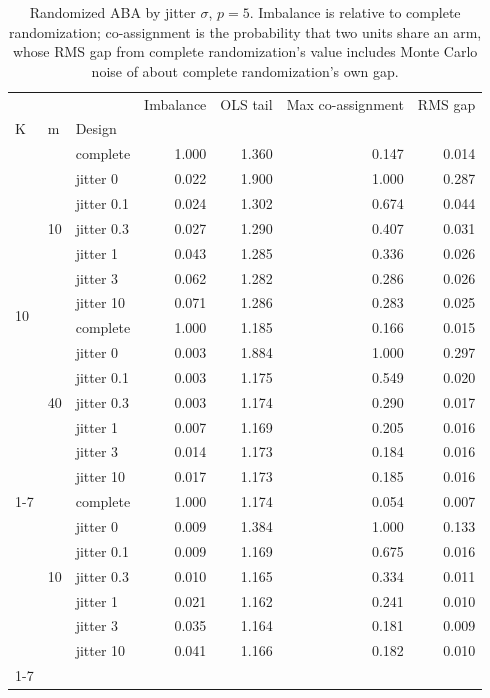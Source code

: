 \begin{table}[t]
\centering
\caption{Randomized ABA by jitter $\sigma$, $p = 5$. Imbalance is relative to complete randomization; co-assignment is the probability that two units share an arm, whose RMS gap from complete randomization's value includes Monte Carlo noise of about complete randomization's own gap.}
\label{tab:jitter}
\begin{tabular}{lllrrrr}
\toprule
 &  &  & Imbalance & OLS tail & Max co-assignment & RMS gap \\
K & m & Design &  &  &  &  \\
\midrule
\multirow[t]{14}{*}{10} & \multirow[t]{7}{*}{10} & complete & 1.000 & 1.360 & 0.147 & 0.014 \\
 &  & jitter 0 & 0.022 & 1.900 & 1.000 & 0.287 \\
 &  & jitter 0.1 & 0.024 & 1.302 & 0.674 & 0.044 \\
 &  & jitter 0.3 & 0.027 & 1.290 & 0.407 & 0.031 \\
 &  & jitter 1 & 0.043 & 1.285 & 0.336 & 0.026 \\
 &  & jitter 3 & 0.062 & 1.282 & 0.286 & 0.026 \\
 &  & jitter 10 & 0.071 & 1.286 & 0.283 & 0.025 \\
\cline{2-7}
 & \multirow[t]{7}{*}{40} & complete & 1.000 & 1.185 & 0.166 & 0.015 \\
 &  & jitter 0 & 0.003 & 1.884 & 1.000 & 0.297 \\
 &  & jitter 0.1 & 0.003 & 1.175 & 0.549 & 0.020 \\
 &  & jitter 0.3 & 0.003 & 1.174 & 0.290 & 0.017 \\
 &  & jitter 1 & 0.007 & 1.169 & 0.205 & 0.016 \\
 &  & jitter 3 & 0.014 & 1.173 & 0.184 & 0.016 \\
 &  & jitter 10 & 0.017 & 1.173 & 0.185 & 0.016 \\
\cline{1-7} \cline{2-7}
\multirow[t]{7}{*}{50} & \multirow[t]{7}{*}{10} & complete & 1.000 & 1.174 & 0.054 & 0.007 \\
 &  & jitter 0 & 0.009 & 1.384 & 1.000 & 0.133 \\
 &  & jitter 0.1 & 0.009 & 1.169 & 0.675 & 0.016 \\
 &  & jitter 0.3 & 0.010 & 1.165 & 0.334 & 0.011 \\
 &  & jitter 1 & 0.021 & 1.162 & 0.241 & 0.010 \\
 &  & jitter 3 & 0.035 & 1.164 & 0.181 & 0.009 \\
 &  & jitter 10 & 0.041 & 1.166 & 0.182 & 0.010 \\
\cline{1-7} \cline{2-7}
\bottomrule
\end{tabular}
\end{table}

